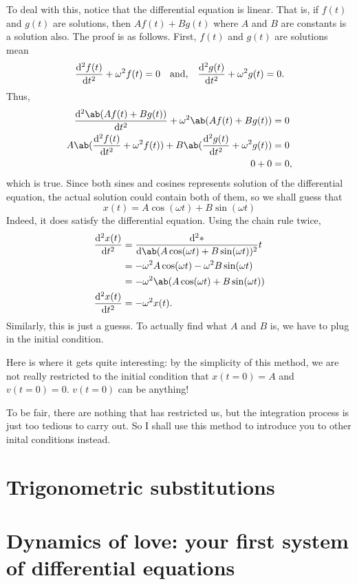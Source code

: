 To deal with this, notice that the differential equation is linear. That is, if $f(t)$ and $g(t)$ are solutions, then $Af(t) + Bg(t)$ where $A$ and $B$ are constants is a solution also. The proof is as follows. First, $f(t)$ and $g(t)$ are solutions mean
\begin{equation}
	\odv[ord = 2]{f(t)}{t} + \omega^2f(t) = 0 \mathand \odv[ord = 2]{g(t)}{t} + \omega^2g(t) = 0.
\end{equation}
Thus,
\begin{align}
	\odv[ord = 2]{\ab(Af(t) + Bg(t))}{t} + \omega^2\ab(Af(t) + Bg(t)) &= 0 \\
	A\ab(\odv[ord = 2]{f(t)}{t} + \omega^2f(t)) + B\ab(\odv[ord = 2]{g(t)}{t} + \omega^2g(t)) &= 0 \\
	0 + 0 &= 0,
\end{align}
which is true. Since both sines and cosines represents solution of the differential equation, the actual solution could contain both of them, so we shall guess that
\begin{equation}
	x(t) = A\cos(\omega t) + B\sin(\omega t)
\end{equation}
Indeed, it does satisfy the differential equation. Using the chain rule twice,
\begin{align}
	\odv[ord = 2]{x(t)}{t} &= \odv[ord = 2]*{\ab(A\cos(\omega t) + B\sin(\omega t))}{t} \\ 
						   &= -\omega^2A\cos(\omega t) - \omega^2B\sin(\omega t) \\
						   &= -\omega^2\ab(A\cos(\omega t) + B\sin(\omega t)) \label{eq:harmonic-oscillator-ansatz-derivative}\\
    \odv[ord = 2]{x(t)}{t} &= -\omega^2x(t).
\end{align}
Similarly, this is just a guesss. To actually find what $A$ and $B$ is, we have to plug in the initial condition.

Here is where it gets quite interesting: by the simplicity of this method, we are not really restricted to the initial condition that $x(t = 0) = A$ and $v(t = 0) = 0$. $v(t = 0)$ can be anything!

To be fair, there are nothing that has restricted us, but the integration process is just too tedious to carry out. So I shall use this method to introduce you to other inital conditions instead.

\section{Trigonometric substitutions}

\section{Dynamics of love: your first system of differential equations}

